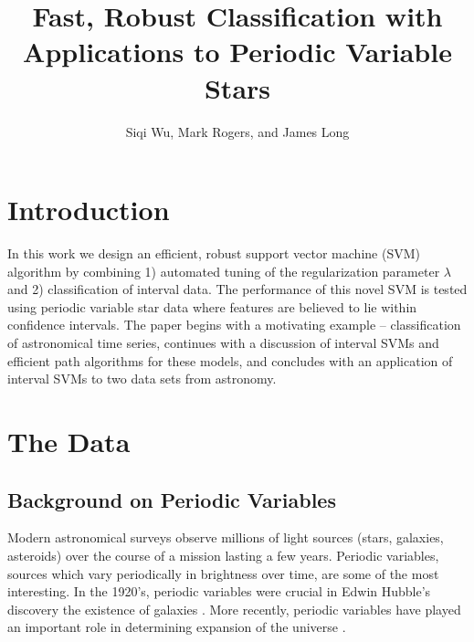 \documentclass[10pt]{article}
\theoremstyle{definition}
\begin{document}
\title{Fast, Robust Classification with Applications to Periodic Variable Stars}
\author{Siqi Wu, Mark Rogers, and James Long}
\maketitle


\section{Introduction}
In this work we design an efficient, robust support vector machine (SVM) algorithm by combining 1) automated tuning of the regularization parameter $\lambda$ and 2) classification of interval data. The performance of this novel SVM is tested using periodic variable star data where features are believed to lie within confidence intervals. The paper begins with a motivating example -- classification of astronomical time series, continues with a discussion of interval SVMs and efficient path algorithms for these models, and concludes with an application of interval SVMs to two data sets from astronomy.

\section{The Data}
\subsection{Background on Periodic Variables}
Modern astronomical surveys observe millions of light sources (stars, galaxies, asteroids) over the course of a mission lasting a few years. Periodic variables, sources which vary periodically in brightness over time, are some of the most interesting. In the 1920's, periodic variables were crucial in Edwin Hubble's discovery the existence of galaxies \cite{berendzen1971hubble}. More recently, periodic variables have played an important role in determining expansion of the universe \cite{freedman2010hubble}.
\end{document}
